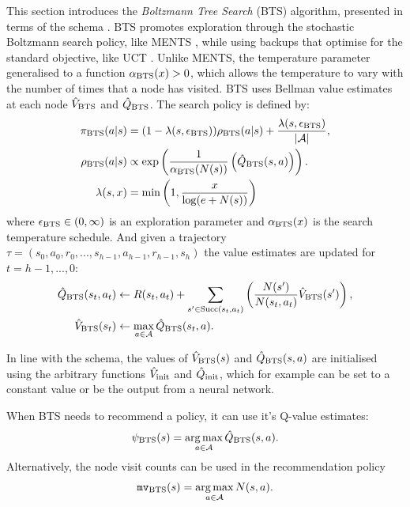         This section introduces the \textit{Boltzmann Tree Search} (BTS) algorithm, presented in terms of the \thtspp\ewe schema . BTS promotes exploration through the stochastic Boltzmann search policy, like MENTS , while using backups that optimise for the standard objective, like UCT . Unlike MENTS, the temperature parameter generalised to a function ${\alpha_{{\textnormal{BTS}}}}(x) > 0$, which allows the temperature to vary with the number of times that a node has visited. BTS uses Bellman value estimates at each node ${\hat{V}_{{\textnormal{BTS}}}}$ and ${\hat{Q}_{{\textnormal{BTS}}}}$. The search policy is defined by:
        \begin{align}
            {\pi_{{\textnormal{BTS}}}}(a|s) &= (1-{\lambda(s,{\epsilon_{{\textnormal{BTS}}}})}){\rho_{{\textnormal{BTS}}}}(a|s) + \frac{{\lambda(s,{\epsilon_{{\textnormal{BTS}}}})}}{|\mathcal{A}|}, 
                        \label{eq:4:bts_search_policy} \\ 
            {\rho_{{\textnormal{BTS}}}}(a|s) &\propto \exp\left(\frac{1}{{\alpha_{{\textnormal{BTS}}}}(N(s))}\left({\hat{Q}_{{\textnormal{BTS}}}}(s,a)\right)\right).
                        \label{eq:4:bts_value_policy} \\
            \lambda(s,x) &= \min\left(1, \frac{x}{\log(e+N(s))}\right) \label{eq:4:lambda}
        \end{align}
        where ${\epsilon_{{\textnormal{BTS}}}} \in (0,\infty)$ is an exploration parameter and ${\alpha_{{\textnormal{BTS}}}}(x)$ is the search temperature schedule.  And given a trajectory $\tau=(s_0,a_0,r_0,...,s_{h-1},a_{h-1},r_{h-1},s_h)$ the value estimates are updated for $t=h-1,...,0$:
        \begin{align}
            {\hat{Q}_{{\textnormal{BTS}}}}(s_t,a_t) &\leftarrow 
                R(s_t,a_t) + \sum_{s' \in {\textnormal{Succ}(s_t,a_t)}} \left( \frac{N(s')}{N(s_t,a_t)} {\hat{V}_{{\textnormal{BTS}}}}(s') \right), 
                        \label{eq:4:bts_backup_q} \\ 
            {\hat{V}_{{\textnormal{BTS}}}}(s_t) &\leftarrow \max_{a\in\mathcal{A}} {\hat{Q}_{{\textnormal{BTS}}}}(s_t,a).
                        \label{eq:4:bts_backup_v} 
        \end{align}
        
        In line with the \thtspp\ewe schema, the values of $\hat{V}_{{\textnormal{BTS}}}(s)$ and $\hat{Q}_{{\textnormal{BTS}}}(s,a)$ are initialised using the arbitrary functions ${\hat{V}_{\textnormal{init}}}$ and ${\hat{Q}_{\textnormal{init}}}$, which for example can be set to a constant value or be the output from a neural network.  
        
        
        When BTS needs to recommend a policy, it can use it's Q-value estimates:
        \begin{align}
            {\psi_{{\textnormal{BTS}}}}(s)=\operatorname*{arg\,max}_{a\in\mathcal{A}}{\hat{Q}_{{\textnormal{BTS}}}}(s,a).
        \end{align}
        Alternatively, the node visit counts can be used in the recommendation policy
        \begin{align}
            {\texttt{mv}_{{\textnormal{BTS}}}}(s) = \operatorname*{arg\,max}_{a\in\mathcal{A}} N(s,a).
        \end{align}

